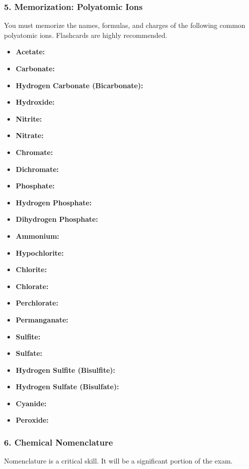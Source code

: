 \documentclass{article}
\begin{document}
\bigskip
\subsubsection*{5. Memorization: Polyatomic Ions}
You must memorize the names, formulas, and charges of the following common polyatomic ions. Flashcards are highly recommended.
\begin{itemize}[itemsep=5pt]
    \item \textbf{Acetate:} 
    \item \textbf{Carbonate:} 
    \item \textbf{Hydrogen Carbonate (Bicarbonate):} 
    \item \textbf{Hydroxide:} 
    \item \textbf{Nitrite:} 
    \item \textbf{Nitrate:} 
    \item \textbf{Chromate:} 
    \item \textbf{Dichromate:} 
    \item \textbf{Phosphate:} 
    \item \textbf{Hydrogen Phosphate:} 
    \item \textbf{Dihydrogen Phosphate:} 
    \item \textbf{Ammonium:} 
    \item \textbf{Hypochlorite:} 
    \item \textbf{Chlorite:} 
    \item \textbf{Chlorate:} 
    \item \textbf{Perchlorate:} 
    \item \textbf{Permanganate:} 
    \item \textbf{Sulfite:} 
    \item \textbf{Sulfate:} 
    \item \textbf{Hydrogen Sulfite (Bisulfite):} 
    \item \textbf{Hydrogen Sulfate (Bisulfate):} 
    \item \textbf{Cyanide:} 
    \item \textbf{Peroxide:} 
\end{itemize}

\bigskip
\subsubsection*{6. Chemical Nomenclature}
Nomenclature is a critical skill. It will be a significant portion of the exam.
\end{document}

